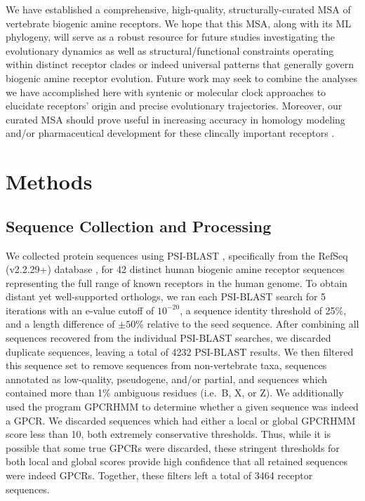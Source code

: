 \documentclass[fleqn,10pt]{wlpeerj}
\begin{document}
We have established a comprehensive, high-quality, structurally-curated MSA of vertebrate biogenic amine receptors. We hope that this MSA, along with its ML phylogeny, will serve as a robust resource for future studies investigating the evolutionary dynamics as well as structural/functional constraints operating within distinct receptor clades or indeed universal patterns that generally govern biogenic amine receptor evolution. Future work may seek to combine the analyses we have accomplished here with syntenic or molecular clock approaches to elucidate receptors' origin and precise evolutionary trajectories. Moreover, our curated MSA should prove useful in increasing accuracy in homology modeling and/or pharmaceutical development for these clincally important receptors \citep{Kristiansen2004,Ishiguro2004,Eversetal2005,Masonetal2012}.




\section*{Methods}

\subsection*{Sequence Collection and Processing}
We collected protein sequences using PSI-BLAST \citep{psiblast}, specifically from the RefSeq (v2.2.29+) database \citep{refseq}, for 42 distinct human biogenic amine receptor sequences representing the full range of known receptors in the human genome. To obtain distant yet well-supported orthologs, we ran each PSI-BLAST search for 5 iterations with an e-value cutoff of $10^{-20}$, a sequence identity threshold of 25\%, and a length difference of $\pm50$\% relative to the seed sequence. After combining all sequences recovered from the individual PSI-BLAST searches, we discarded duplicate sequences, leaving a total of 4232 PSI-BLAST results. We then filtered this sequence set to remove sequences from non-vertebrate taxa, sequences annotated as low-quality, pseudogene, and/or partial, and sequences which contained more than 1\% ambiguous residues (i.e.\ B, X, or Z). We additionally used the program GPCRHMM \citep{Wistrand2006} to determine whether a given sequence was indeed a GPCR. We discarded sequences which had either a local or global GPCRHMM score less than 10, both extremely conservative thresholds. Thus, while it is possible that some true GPCRs were discarded, these stringent thresholds for both local and global scores provide high confidence that all retained sequences were indeed GPCRs. Together, these filters left a total of 3464 receptor sequences.
\end{document}
